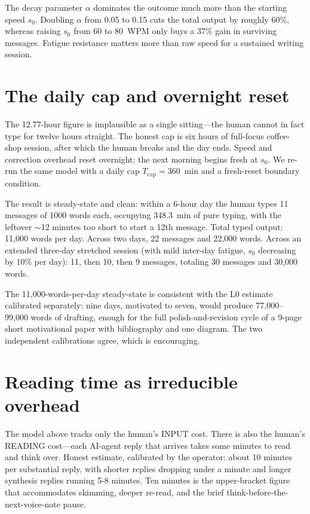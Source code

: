 \documentclass[11pt]{article}
\begin{document}
The decay parameter $\alpha$ dominates the outcome much more than the starting speed $s_0$. Doubling $\alpha$ from 0.05 to 0.15 cuts the total output by roughly 60\%, whereas raising $s_0$ from 60 to 80~WPM only buys a 37\% gain in surviving messages. Fatigue resistance matters more than raw speed for a sustained writing session.

\section{The daily cap and overnight reset}

The 12.77-hour figure is implausible as a single sitting---the human cannot in fact type for twelve hours straight. The honest cap is six hours of full-focus coffee-shop session, after which the human breaks and the day ends. Speed and correction overhead reset overnight; the next morning begins fresh at $s_0$. We re-run the same model with a daily cap $T_{\text{cap}} = 360$~min and a fresh-reset boundary condition.

The result is steady-state and clean: within a 6-hour day the human types 11 messages of 1000 words each, occupying 348.3~min of pure typing, with the leftover $\sim$12 minutes too short to start a 12th message. Total typed output: 11{,}000 words per day. Across two days, 22 messages and 22{,}000 words. Across an extended three-day stretched session (with mild inter-day fatigue, $s_0$ decreasing by 10\% per day): 11, then 10, then 9 messages, totaling 30 messages and 30{,}000 words.

The 11{,}000-words-per-day steady-state is consistent with the L0 estimate calibrated separately: nine days, motivated to seven, would produce 77{,}000--99{,}000 words of drafting, enough for the full polish-and-revision cycle of a 9-page short motivational paper with bibliography and one diagram. The two independent calibrations agree, which is encouraging.

\section{Reading time as irreducible overhead}

The model above tracks only the human's INPUT cost. There is also the human's READING cost---each AI-agent reply that arrives takes some minutes to read and think over. Honest estimate, calibrated by the operator: about 10 minutes per substantial reply, with shorter replies dropping under a minute and longer synthesis replies running 5-8 minutes. Ten minutes is the upper-bracket figure that accommodates skimming, deeper re-read, and the brief think-before-the-next-voice-note pause.
\end{document}
